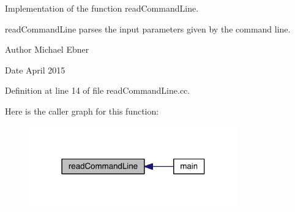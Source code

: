 Implementation of the function read\+Command\+Line. 

read\+Command\+Line parses the input parameters given by the command line.

\begin{DoxyAuthor}{Author}
Michael Ebner 
\end{DoxyAuthor}
\begin{DoxyDate}{Date}
April 2015 
\end{DoxyDate}


Definition at line 14 of file read\+Command\+Line.\+cc.



Here is the caller graph for this function\+:\nopagebreak
\begin{figure}[H]
\begin{center}
\leavevmode
\includegraphics[width=255pt]{a00112_a20e7468e7c7621b99ed5a35e29a56623_icgraph}
\end{center}
\end{figure}


